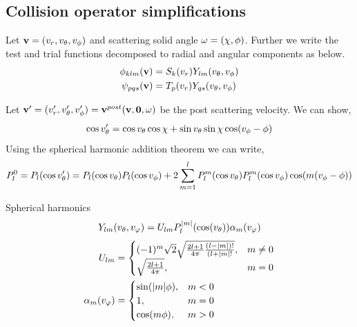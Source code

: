 \documentclass{article}[draft]
\begin{document}
\subsection{Collision operator simplifications}
\label{sec:collop_simplifications}
Let $\mathbf{v} = (v_r, v_\theta, v_\phi) $ and scattering solid angle $\mathbf{\omega} = (\chi, \phi)$. Further we write the test and trial functions decomposed to radial and angular components as below. 
\begin{align*}
\phi_{klm}\of{\vect{v}} &= S_{k}\of{v_r} Y_{lm} \of{v_\theta, v_\phi}\\
\psi_{pqs}\of{\vect{v}} &= T_{p}\of{v_r} Y_{qs} \of{v_\theta, v_\phi}
\end{align*}

Let $\vect{v}^{\prime} = (v_r^\prime, v_\theta^\prime, v_\phi^\prime) =\vect{v}^{post}\of{\vect{v},\vect{0},\vect{\omega}}$ be the post scattering velocity. We can show, 
\begin{align*}
\cos v_\theta^\prime = \cos v_\theta \cos\chi + \sin v_\theta \sin \chi \cos\of{v_\phi-\phi}
\end{align*} Using the spherical harmonic addition theorem we can write, 
\begin{align*}
P_l^{0} = P_l\of{\cos v_\theta^\prime} =  P_l\of{\cos v_\theta} P_l\of{\cos v_\phi} + 2\sum_{m=1}^{l} P_l^{m}\of{\cos v_\theta} P_l^{m}\of{\cos v_\phi} \cos \of{ m (v_\phi-\phi)}
\end{align*}

Spherical harmonics
\begin{align*}
Y_{lm}\of{\vtheta,\vphi} = U_{lm} P^{|m|}_l\of{\cos\of{\vtheta}} \alpha_m\of{\vphi}
\end{align*}
\begin{align*}
U_{lm} &= 
\begin{cases}
(-1)^m \sqrt{2} \sqrt{\frac{2l+1}{4\pi} \frac{(l-|m|)!}{(l+|m|!}}, &m\neq 0 \\
\sqrt{\frac{2l+1}{4\pi}}, &m = 0
\end{cases}
\\
\alpha_m\of{\vphi}
&=
\begin{cases}
\sin\of{|m|\phi}, &m < 0 \\
1, &m = 0\\
\cos\of{m\phi}, &m > 0
\end{cases}
\end{align*}
\end{document}

